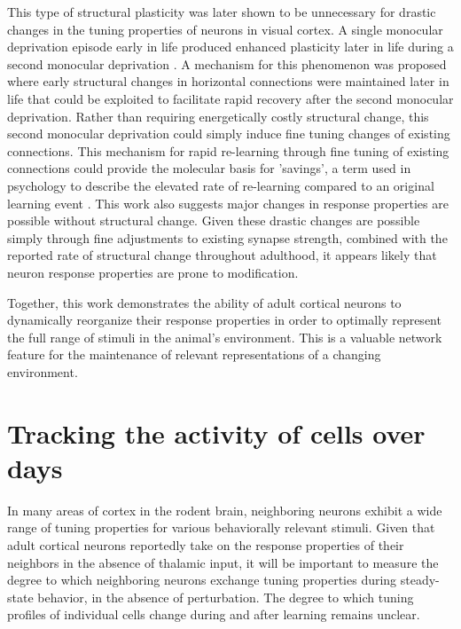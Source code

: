 This type of structural plasticity was later shown to be unnecessary for drastic changes in the tuning properties of neurons in visual cortex. A single monocular deprivation episode early in life produced enhanced plasticity later in life during a second monocular deprivation \citep{Hofer2006, Hofer2009}. A mechanism for this phenomenon was proposed where early structural changes in horizontal connections were maintained later in life that could be exploited to facilitate rapid recovery after the second monocular deprivation. Rather than requiring energetically costly structural change, this second monocular deprivation could simply induce fine tuning changes of existing connections. This mechanism for rapid re-learning through fine tuning of existing connections could provide the molecular basis for 'savings', a term used in psychology to describe the elevated rate of re-learning compared to an original learning event \citep{Ebbinghaus1880}. This work also suggests major changes in response properties are possible without structural change. Given these drastic changes are possible simply through fine adjustments to existing synapse strength, combined with the reported rate of structural change throughout adulthood, it appears likely that neuron response properties are prone to modification.

\bigskip

Together, this work demonstrates the ability of adult cortical neurons to dynamically reorganize their response properties in order to optimally represent the full range of stimuli in the animal's environment. This is a valuable network feature for the maintenance of relevant representations of a changing environment.

\section{Tracking the activity of cells over days}

In many areas of cortex in the rodent brain, neighboring neurons exhibit a wide range of tuning properties for various behaviorally relevant stimuli. Given that adult cortical neurons reportedly take on the response properties of their neighbors in the absence of thalamic input, it will be important to measure the degree to which neighboring neurons exchange tuning properties during steady-state behavior, in the absence of perturbation. The degree to which tuning profiles of individual cells change during and after learning remains unclear.

